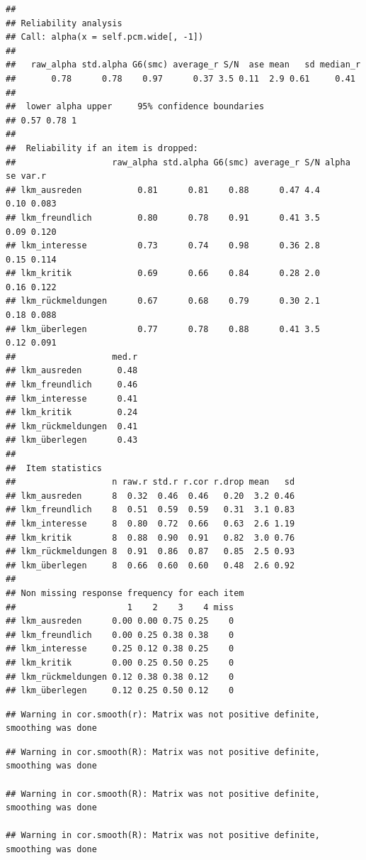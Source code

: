\documentclass[
  english,
  man,floatsintext]{apa6}
\begin{document}
\begin{verbatim}
## 
## Reliability analysis   
## Call: alpha(x = self.pcm.wide[, -1])
## 
##   raw_alpha std.alpha G6(smc) average_r S/N  ase mean   sd median_r
##       0.78      0.78    0.97      0.37 3.5 0.11  2.9 0.61     0.41
## 
##  lower alpha upper     95% confidence boundaries
## 0.57 0.78 1 
## 
##  Reliability if an item is dropped:
##                   raw_alpha std.alpha G6(smc) average_r S/N alpha se var.r
## lkm_ausreden           0.81      0.81    0.88      0.47 4.4     0.10 0.083
## lkm_freundlich         0.80      0.78    0.91      0.41 3.5     0.09 0.120
## lkm_interesse          0.73      0.74    0.98      0.36 2.8     0.15 0.114
## lkm_kritik             0.69      0.66    0.84      0.28 2.0     0.16 0.122
## lkm_rückmeldungen      0.67      0.68    0.79      0.30 2.1     0.18 0.088
## lkm_überlegen          0.77      0.78    0.88      0.41 3.5     0.12 0.091
##                   med.r
## lkm_ausreden       0.48
## lkm_freundlich     0.46
## lkm_interesse      0.41
## lkm_kritik         0.24
## lkm_rückmeldungen  0.41
## lkm_überlegen      0.43
## 
##  Item statistics 
##                   n raw.r std.r r.cor r.drop mean   sd
## lkm_ausreden      8  0.32  0.46  0.46   0.20  3.2 0.46
## lkm_freundlich    8  0.51  0.59  0.59   0.31  3.1 0.83
## lkm_interesse     8  0.80  0.72  0.66   0.63  2.6 1.19
## lkm_kritik        8  0.88  0.90  0.91   0.82  3.0 0.76
## lkm_rückmeldungen 8  0.91  0.86  0.87   0.85  2.5 0.93
## lkm_überlegen     8  0.66  0.60  0.60   0.48  2.6 0.92
## 
## Non missing response frequency for each item
##                      1    2    3    4 miss
## lkm_ausreden      0.00 0.00 0.75 0.25    0
## lkm_freundlich    0.00 0.25 0.38 0.38    0
## lkm_interesse     0.25 0.12 0.38 0.25    0
## lkm_kritik        0.00 0.25 0.50 0.25    0
## lkm_rückmeldungen 0.12 0.38 0.38 0.12    0
## lkm_überlegen     0.12 0.25 0.50 0.12    0
\end{verbatim}

\begin{verbatim}
## Warning in cor.smooth(r): Matrix was not positive definite, smoothing was done
\end{verbatim}

\begin{verbatim}
## Warning in cor.smooth(R): Matrix was not positive definite, smoothing was done

## Warning in cor.smooth(R): Matrix was not positive definite, smoothing was done

## Warning in cor.smooth(R): Matrix was not positive definite, smoothing was done
\end{verbatim}
\end{document}
